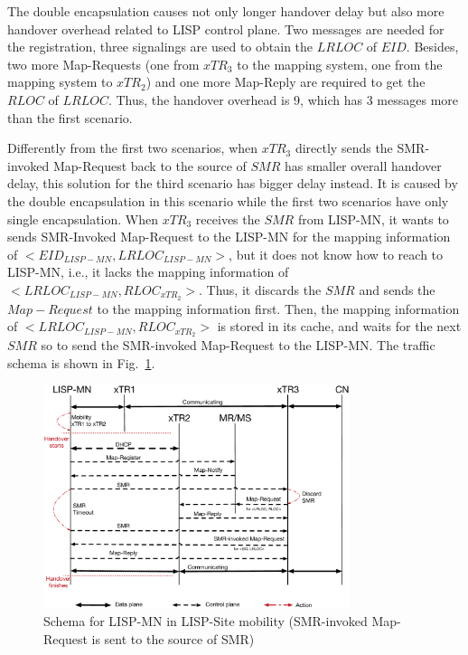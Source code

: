 The double encapsulation causes not only longer handover delay but also more handover overhead related to LISP control plane. Two messages are needed for the registration, three signalings are used to obtain the $LRLOC$ of $EID$. Besides, two more Map-Requests (one from $xTR_3$ to the mapping system, one from the mapping system to $xTR_2$) and one more Map-Reply are required to get the $RLOC$ of $LRLOC$. Thus, the handover overhead is 9, which has 3 messages more than the first scenario.

Differently from the first two scenarios, when $xTR_3$ directly sends the SMR-invoked Map-Request back to the source of $SMR$ has smaller overall handover delay, this solution for the third scenario has bigger delay instead. It is caused by the double encapsulation in this scenario while the first two scenarios have only single encapsulation. When $xTR_3$ receives the $SMR$ from LISP-MN, it wants to sends SMR-Invoked Map-Request to the LISP-MN for the mapping information of $<EID_{LISP-MN}, LRLOC_{LISP-MN}>$, but it does not know how to reach to LISP-MN, i.e., it lacks the mapping information of $<LRLOC_{LISP-MN}, RLOC_{xTR_2}>$. Thus, it discards the $SMR$ and sends the $Map-Request$ to the mapping information first. Then, the mapping information of $<LRLOC_{LISP-MN}, RLOC_{xTR_2}>$ is stored in its cache, and waits for the next $SMR$ so to send the SMR-invoked Map-Request to the LISP-MN. The traffic schema is shown in Fig.~\ref{Mobility_double_encap_schema_SMR_askxTR_simplify}.
\begin{figure}[!th]
	\centering
	\includegraphics[width=0.8\textwidth]{Pics/Mobility_double_encap_schema_SMR_askxTR_simplify}
	\caption{Schema for LISP-MN in LISP-Site mobility (SMR-invoked Map-Request is sent to the source of SMR)}
	\label{Mobility_double_encap_schema_SMR_askxTR_simplify}
\end{figure}

